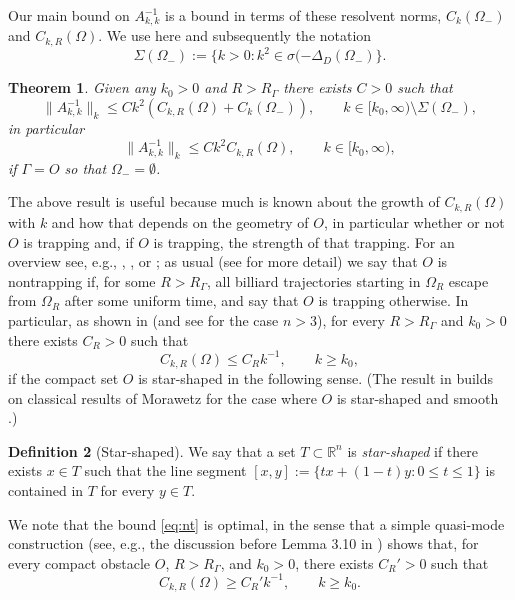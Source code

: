 \documentclass{birkjour}
\newtheorem{theorem}{Theorem}[section]
\theoremstyle{definition}
\newtheorem{definition}[theorem]{Definition}
\theoremstyle{remark}
\numberwithin{equation}{section}
\newcommand{\R}{\mathbb{R}}
\begin{document}
Our main bound on $A_{k,k}^{-1}$ is a bound in terms of these resolvent norms, $C_k(\Omega_-)$ and $C_{k,R}(\Omega)$. We use here and subsequently the notation
\begin{equation} \label{eq:Kkdef}
\Sigma(\Omega_-) := \{k>0: k^2\in \sigma(-\Delta_D(\Omega_-)\}.
\end{equation}
\begin{theorem} \label{thm:main}
Given any $k_0>0$ and $R>R_\Gamma$ there exists $C>0$ such that
$$
\|A_{k,k}^{-1}\|_k \leq Ck^2\left(C_{k,R}(\Omega) + C_k(\Omega_-)\right), \qquad k\in [k_0,\infty)\setminus \Sigma(\Omega_-),
$$
in particular
$$
\|A_{k,k}^{-1}\|_k \leq Ck^2 C_{k,R}(\Omega), \qquad k\in [k_0,\infty),
$$
if $\Gamma=O$ so that $\Omega_-=\emptyset$.
\end{theorem}



The above result is useful because much is known about the growth of $C_{k,R}(\Omega)$ with $k$ and how that depends on the geometry of $O$, in particular whether or not $O$ is trapping and, if $O$ is trapping, the strength of that trapping. For an overview see, e.g., \cite[\S1.1, Table 6.1]{chandler2020high}, \cite[\S1.1]{lafontaine2021most}, or \cite[\S1.2]{SiavashSimon0}; as usual (see \cite{chandler2020high} for more detail) we say that $O$ is nontrapping if, for some $R>R_\Gamma$, all billiard trajectories starting in $\Omega_R$ escape from $\Omega_R$ after some uniform time, and say that $O$ is trapping otherwise. In particular, as shown in \cite{CWMonk2008} (and see \cite[Thm.~1.2]{SiavashSimon0} for the case $n> 3$), for every $R>R_\Gamma$ and $k_0>0$ there exists $C_R>0$ such that
\begin{equation} \label{eq:nt}
C_{k,R}(\Omega) \leq C_Rk^{-1}, \qquad k\geq k_0,
\end{equation}
if the compact set $O$ is star-shaped in the following sense. (The result  in \cite{CWMonk2008} builds on classical results of Morawetz for the case where $O$ is star-shaped and smooth \cite{morawetzludwig1968,morawetz1975}.)
\begin{definition}[Star-shaped] \label{def:ss}
We say that a set $T\subset \R^n$ is {\em star-shaped} if there exists $x\in T$ such that the line segment $[x,y]:= \{tx+(1-t)y:0\leq t\leq 1\}$ is contained in $T$ for every $y\in T$.
\end{definition}
\noindent We note that the bound \eqref{eq:nt} is optimal, in the sense that a simple quasi-mode construction (see, e.g., the discussion before Lemma 3.10 in \cite{CWMonk2008}) shows that, for every compact obstacle $O$, $R>R_\Gamma$, and $k_0>0$, there exists $C_R'>0$ such that 
\begin{equation} \label{eq:nt2}
C_{k,R}(\Omega) \geq C_R'k^{-1}, \qquad k\geq k_0.
\end{equation}
\end{document}
